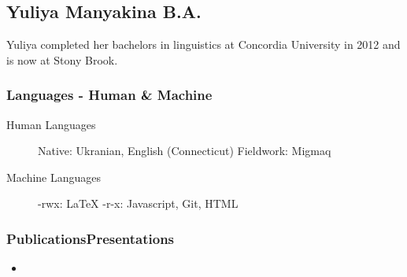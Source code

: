 \documentclass[12 pt]{article}
\begin{document}
\subsection{Yuliya Manyakina B.A.}

Yuliya completed her bachelors in linguistics at Concordia University in 2012 and is now at Stony Brook.

\subsubsection{Languages - Human \& Machine}
\begin{description}
\item [
Human Languages] Native: Ukranian,  English (Connecticut) Fieldwork: Migmaq 
\item [
Machine Languages]  -rwx: LaTeX -r-x:  Javascript, Git, HTML

\end{description}


\subsubsection{PublicationsPresentations}

\begin{itemize}
\item 
\end{itemize}
\end{document}
